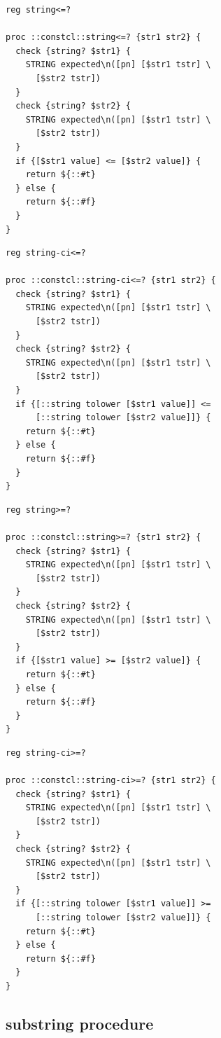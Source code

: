 \documentclass[twoside]{report}
\begin{document}
\begin{lstlisting}
reg string<=?

proc ::constcl::string<=? {str1 str2} {
  check {string? $str1} {
    STRING expected\n([pn] [$str1 tstr] \
      [$str2 tstr])
  }
  check {string? $str2} {
    STRING expected\n([pn] [$str1 tstr] \
      [$str2 tstr])
  }
  if {[$str1 value] <= [$str2 value]} {
    return ${::#t}
  } else {
    return ${::#f}
  }
}
\end{lstlisting}

\begin{lstlisting}
reg string-ci<=?

proc ::constcl::string-ci<=? {str1 str2} {
  check {string? $str1} {
    STRING expected\n([pn] [$str1 tstr] \
      [$str2 tstr])
  }
  check {string? $str2} {
    STRING expected\n([pn] [$str1 tstr] \
      [$str2 tstr])
  }
  if {[::string tolower [$str1 value]] <=
      [::string tolower [$str2 value]]} {
    return ${::#t}
  } else {
    return ${::#f}
  }
}
\end{lstlisting}

\begin{lstlisting}
reg string>=?

proc ::constcl::string>=? {str1 str2} {
  check {string? $str1} {
    STRING expected\n([pn] [$str1 tstr] \
      [$str2 tstr])
  }
  check {string? $str2} {
    STRING expected\n([pn] [$str1 tstr] \
      [$str2 tstr])
  }
  if {[$str1 value] >= [$str2 value]} {
    return ${::#t}
  } else {
    return ${::#f}
  }
}
\end{lstlisting}

\begin{lstlisting}
reg string-ci>=?

proc ::constcl::string-ci>=? {str1 str2} {
  check {string? $str1} {
    STRING expected\n([pn] [$str1 tstr] \
      [$str2 tstr])
  }
  check {string? $str2} {
    STRING expected\n([pn] [$str1 tstr] \
      [$str2 tstr])
  }
  if {[::string tolower [$str1 value]] >=
      [::string tolower [$str2 value]]} {
    return ${::#t}
  } else {
    return ${::#f}
  }
}
\end{lstlisting}

\subsection{substring procedure}
\label{substring-procedure}
\end{document}
